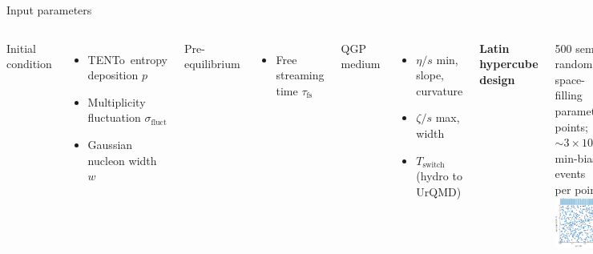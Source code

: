 \documentclass{beamer}
\newcommand{\trento}{T\raisebox{-0.3ex}{R}ENTo}
\begin{document}
\begin{frame}{Input parameters}
  \begin{columns}
    Initial condition
    \begin{itemize}
      \item \trento\ entropy deposition $p$
      \item Multiplicity fluctuation $\sigma_\text{fluct}$
      \item Gaussian nucleon width $w$
    \end{itemize}
    \medskip
    Pre-equilibrium
    \begin{itemize}
      \item Free streaming time $\tau_\text{fs}$
    \end{itemize}
    \medskip
    QGP medium
    \begin{itemize}
      \item $\eta/s$ min, slope, curvature
      \item $\zeta/s$ max, width
      \item $T_\text{switch}$ (hydro to UrQMD)
    \end{itemize}
    \begin{center}
      \textbf{Latin hypercube design}
    \end{center}
    500 semi-random, space-filling parameter points;
    ${\sim}3 \times 10^4$ min-bias events per point \\[1em]
    \includegraphics{design}
  \end{columns}
\end{frame}
\end{document}
